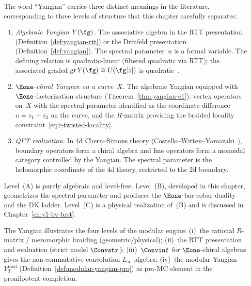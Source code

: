 \label{lem:super-trace-berezinian-bridge}

\begin{remark}
\label{rem:yangian-three-levels}
The word ``Yangian'' carries three distinct meanings in the
literature, corresponding to three levels of structure that this
chapter carefully separates:
\begin{enumerate}[label=\textup{(\Alph*)}]
\item \emph{Algebraic Yangian $Y(\fg)$.}
 The associative algebra in the RTT presentation
 (Definition~\ref{def:yangian-rtt}) or the Drinfeld presentation
 (Definition~\ref{def:yangian}). The spectral parameter~$u$ is a
 formal variable. The defining relation is
 quadratic-linear (filtered quadratic via RTT);
 the associated graded
 $\operatorname{gr} Y(\fg) \cong U(\fg[z])$ is
 quadratic~\cite{Drinfeld85,molev-yangians}.
\item \emph{$\Eone$-chiral Yangian on a curve~$X$.}
 The algebraic Yangian equipped with $\Eone$-factorization structure
 (Theorem~\ref{thm:yangian-e1}): vertex operators on~$X$ with
 the spectral parameter identified as the coordinate difference
 $u = z_1 - z_2$ on the curve, and the $R$-matrix providing the
 braided locality constraint~\eqref{eq:r-twisted-locality}.
\item \emph{QFT realization.}
 In 4d Chern--Simons theory (Costello--Witten--Yamazaki~\cite{CWY18}),
 boundary operators form a chiral algebra and line operators form
 a monoidal category controlled by the Yangian. The spectral
 parameter is the holomorphic coordinate of the 4d theory,
 restricted to the 2d boundary.
\end{enumerate}
Level~(A) is purely algebraic and level-free.
Level~(B), developed in this chapter, geometrizes the spectral
parameter and produces the $\Eone$-bar-cobar duality and the DK
ladder. Level~(C) is a physical realization of~(B) and is
discussed in Chapter~\ref{ch:v1-bv-brst}.
\end{remark}

\begin{remark}
\label{rem:yangian-four-level}
The Yangian illustrates the four levels of the modular engine:
(i)~the rational $R$-matrix / meromorphic braiding
(geometric/physical);
(ii)~the RTT presentation and evaluation
(strict model $\Convstr$);
(iii)~$\Convinf$ for $\Eone$-chiral algebras gives
the non-commutative convolution $L_\infty$-algebra;
(iv)~the modular Yangian $Y_T^{\mathrm{mod}}$
(Definition~\ref{def:modular-yangian-pro}) as pro-MC element
in the pronilpotent completion.
\end{remark}

